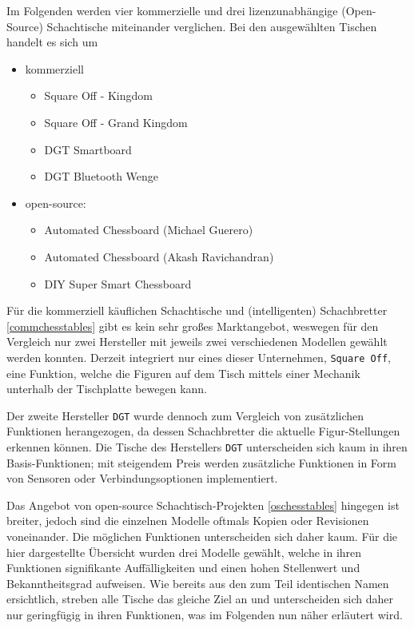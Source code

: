 Im Folgenden werden vier kommerzielle und drei lizenzunabhängige
(Open-Source) Schachtische miteinander verglichen. Bei den ausgewählten
Tischen handelt es sich um

\begin{itemize}
\tightlist
\item
  kommerziell

  \begin{itemize}
  \tightlist
  \item
    Square Off - Kingdom\cite{squareoffkingdom}
  \item
    Square Off - Grand Kingdom\cite{squareoffgrand}
  \item
    DGT Smartboard\cite{dtgsmartboard}
  \item
    DGT Bluetooth Wenge\cite{dtgble}
  \end{itemize}
\item
  open-source:

  \begin{itemize}
  \tightlist
  \item
    Automated Chessboard (Michael Guerero)\cite{actproject1}
  \item
    Automated Chessboard (Akash Ravichandran)\cite{actproject2}
  \item
    DIY Super Smart Chessboard\cite{actproject3}
  \end{itemize}
\end{itemize}

Für die kommerziell käuflichen Schachtische und (intelligenten)
Schachbretter \ref{commchesstables} gibt es kein sehr großes
Marktangebot, weswegen für den Vergleich nur zwei Hersteller mit jeweils
zwei verschiedenen Modellen gewählt werden konnten. Derzeit integriert
nur eines dieser Unternehmen, \passthrough{\lstinline!Square Off!}, eine
Funktion, welche die Figuren auf dem Tisch mittels einer Mechanik
unterhalb der Tischplatte bewegen kann.

Der zweite Hersteller \passthrough{\lstinline!DGT!} wurde dennoch zum
Vergleich von zusätzlichen Funktionen herangezogen, da dessen
Schachbretter die aktuelle Figur-Stellungen erkennen können. Die Tische
des Herstellers \passthrough{\lstinline!DGT!} unterscheiden sich kaum in
ihren Basis-Funktionen; mit steigendem Preis werden zusätzliche
Funktionen in Form von Sensoren oder Verbindungsoptionen implementiert.

Das Angebot von open-source Schachtisch-Projekten \ref{oschesstables}
hingegen ist breiter, jedoch sind die einzelnen Modelle oftmals Kopien
oder Revisionen voneinander. Die möglichen Funktionen unterscheiden sich
daher kaum. Für die hier dargestellte Übersicht wurden drei Modelle
gewählt, welche in ihren Funktionen signifikante Auffälligkeiten und
einen hohen Stellenwert und Bekanntheitsgrad aufweisen. Wie bereits aus
den zum Teil identischen Namen ersichtlich, streben alle Tische das
gleiche Ziel an und unterscheiden sich daher nur geringfügig in ihren
Funktionen, was im Folgenden nun näher erläutert wird.

